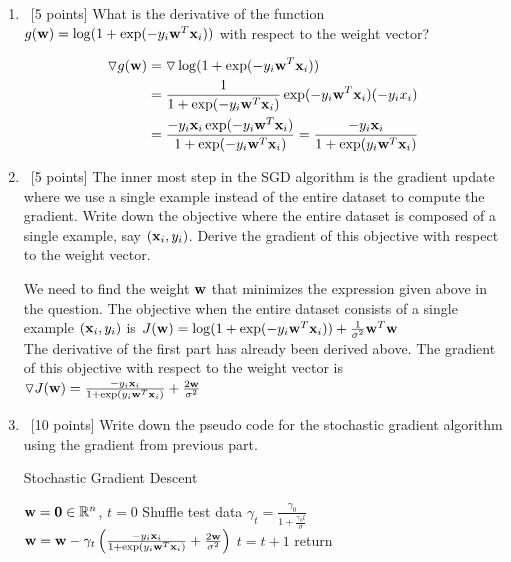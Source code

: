 \begin{enumerate}
\item ~[5 points] What is the derivative of the function $g({\bf w}) = \log(1+ \exp(-y_i{\bf w}^T{\bf x}_i))$ with respect to the weight vector?

\begin{equation*}
\begin{aligned}
\triangledown g({\bf w}) &= \triangledown \log(1+ \exp(-y_i{\bf w}^T{\bf x}_i))\\
&= \frac{1}{1+ \exp(-y_i{\bf w}^T{\bf x}_i)} \exp(-y_i{\bf w}^T{\bf x}_i) (-y_i x_i)\\
&= \frac{-y_i {\bf x}_i \exp(-y_i{\bf w}^T{\bf x}_i)}{1+ \exp(-y_i{\bf w}^T{\bf x}_i)} = \frac{-y_i {\bf x}_i}{1+ \exp(y_i{\bf w}^T{\bf x}_i)}
\end{aligned}
\end{equation*}


\item ~[5 points] The inner most step in the SGD algorithm is the gradient update where we use a single example instead of the entire dataset to compute the gradient. Write down the objective where the entire dataset is composed of a single example, say $({\bf x}_i, y_i)$. Derive the gradient of this objective with respect to the weight vector.

We need to find the weight ${\bf w}$ that minimizes the expression given above in the question. The objective when the entire dataset consists of a single example $({\bf x}_i, y_i)$ is $J({\bf w}) = \log(1+ \exp(-y_i{\bf w}^T{\bf x}_i)) + \frac{1}{\sigma^2}{\bf w}^T{\bf w}$\\


The derivative of the first part has already been derived above. The gradient of this objective with respect to the weight vector is $\triangledown J({\bf w}) = \frac{-y_i {\bf x}_i}{1+ \exp(y_i{\bf w}^T{\bf x}_i)} + \frac{2{\bf w}}{\sigma^2}$

\item ~[10 points] Write down the pseudo code for the stochastic gradient algorithm using the gradient from previous part.

\begin{minipage}{\linewidth}
  \begin{algorithm}[H]
    \caption{Stochastic Gradient Descent }\label{AlgSGD}
    \begin{algorithmic}[1]
        \State ${\bf w} = \textbf{0} \in \mathbb{R}^n$, $t = 0$
	        \State Shuffle test data
			\State  $\gamma_t  = \frac{\gamma_0}{1+ \frac{\gamma_0 t}{\sigma}}$
			\State ${\bf w} = {\bf w} -  \gamma_t \left (\frac{-y_i {\bf x}_i}{1+ \exp(y_i{\bf w}^T{\bf x}_i)} + \frac{2{\bf w}}{\sigma^2} \right )$
			\State $ t = t+1$
          	\EndFor
	\EndFor
      \State return \bw
      \EndProcedure
    \end{algorithmic}
  \end{algorithm}
\end{minipage}\\\\


\end{enumerate}
